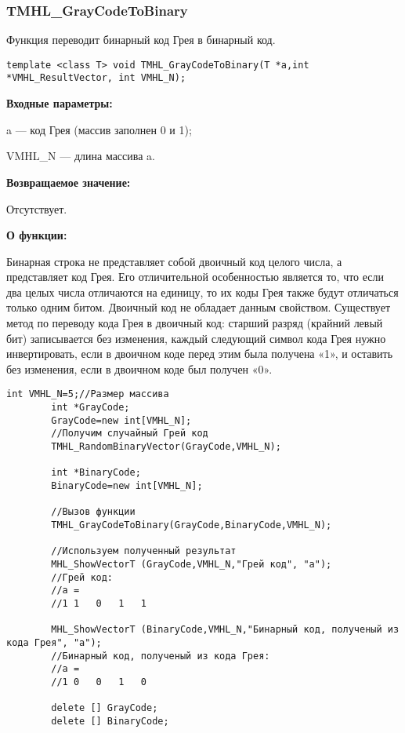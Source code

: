 \documentclass[a4paper,12pt]{article}
\begin{document}
\subsubsection{TMHL\_GrayCodeToBinary}\label{TMHL_GrayCodeToBinary}

Функция переводит бинарный код Грея в бинарный код.


\begin{lstlisting}[label=code_syntax_TMHL_GrayCodeToBinary,caption=Синтаксис]
template <class T> void TMHL_GrayCodeToBinary(T *a,int *VMHL_ResultVector, int VMHL_N);
\end{lstlisting}

\textbf{Входные параметры:}
 
 a --- код Грея (массив заполнен 0 и 1);
 
 VMHL\_N --- длина массива a.
 
\textbf{Возвращаемое значение:}

 Отсутствует.
 
\textbf{О функции:}

Бинарная строка не представляет собой двоичный код целого числа, а представляет код Грея. Его отличительной особенностью является то, что если два целых числа отличаются на единицу, то их коды Грея также будут отличаться только одним битом. Двоичный код не обладает данным свойством.
Существует метод по переводу кода Грея в двоичный код: старший разряд (крайний левый бит) записывается без изменения, каждый следующий символ кода Грея нужно инвертировать, если в двоичном коде перед этим была получена «1», и оставить без изменения, если в двоичном коде был получен «0». 


\begin{lstlisting}[label=code_use_TMHL_GrayCodeToBinary,caption=Пример использования]
        int VMHL_N=5;//Размер массива
        int *GrayCode;
        GrayCode=new int[VMHL_N];
        //Получим случайный Грей код
        TMHL_RandomBinaryVector(GrayCode,VMHL_N);

        int *BinaryCode;
        BinaryCode=new int[VMHL_N];

        //Вызов функции
        TMHL_GrayCodeToBinary(GrayCode,BinaryCode,VMHL_N);

        //Используем полученный результат
        MHL_ShowVectorT (GrayCode,VMHL_N,"Грей код", "a");
        //Грей код:
        //a =
        //1	1	0	1	1

        MHL_ShowVectorT (BinaryCode,VMHL_N,"Бинарный код, полученый из кода Грея", "a");
        //Бинарный код, полученый из кода Грея:
        //a =
        //1	0	0	1	0

        delete [] GrayCode;
        delete [] BinaryCode;
\end{lstlisting}
\end{document}
